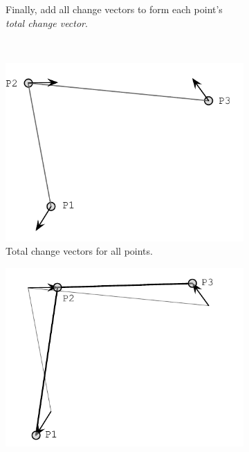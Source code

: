 \begin{figure}
\begin{subfigure}[t]{51mm}
    \caption{Finally, add all change vectors to form each point's
      \textit{total change vector}.}
    \label{fig:solving-accum-1}
  \end{subfigure}
  \\ \vspace{5mm}
  \begin{subfigure}[t]{51mm}
    \includegraphics[width=\linewidth]{img/solving-accum-2.pdf}
    \caption{Total change vectors for all points.}
    \label{fig:solving-accum-2}
  \end{subfigure}
  \hspace{1mm} %
  \begin{subfigure}[t]{51mm}
    \includegraphics[width=\linewidth]{img/solving-total-change.pdf}

\end{subfigure}
\end{figure}
